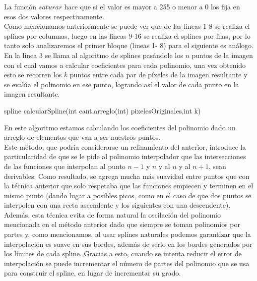 La función $saturar$ hace que si el valor es mayor a 255 o menor a 0 los fija en esos dos valores respectivamente.\\
Como mencionamos anteriormente se puede ver que de las lineas 1-8 se realiza el splines por columnas, luego en las lineas 9-16 se realiza el splines por filas, por lo tanto solo analizaremos el primer bloque (lineas 1- 8) para el siguiente es análogo.\\
En la linea 3 se llama al algoritmo de splines pasándole los $n$ puntos de la imagen con el cual vamos a calcular coeficientes para cada polinomio, una vez obtenido esto se recorren los $k$ puntos entre cada par de píxeles de la imagen resultante y se evalúa el polinomio en ese punto, logrando así el valor de cada punto en la imagen resultante. 
\begin{algorithm}[H]
\begin{algorithmic}[1]\parskip=1mm
\caption{spline calcularSpline(int cant,arreglo(int) pixelesOriginales,int k)}
  \STATE{\quad$ (cs_{i} + 1] - cs[i]) / (3 * k)$}
\end{algorithmic}
\end{algorithm}

En este algoritmo \cite{burden} estamos calculando los coeficientes del polinomio dado un arreglo de elementos que van a ser nuestros puntos.\\

Este método, que podría considerarse un refinamiento del anterior, introduce la particularidad de que se le pide al polinomio interpolador que las intersecciones de las funciones que interpolan al punto $n-1$ y $n$ y al $n$ y al $n+1$, sean derivables. Como resultado, se agrega mucha más suavidad entre puntos que con la técnica anterior que solo respetaba que las funciones empiecen y terminen en el mismo punto (dando lugar a posibles picos, como en el caso de que dos puntos se interpolen con una recta ascendente y los siguientes con una descendente). Además, esta técnica evita de forma natural la oscilación del polinomio mencionada en el método anterior dado que siempre se toman polinomios por partes y, como mencionamos, al usar splines naturales podemos garantizar que la interpolación es suave en sus bordes, además de serlo en los bordes generados por los límites de cada spline. Gracias a esto, cuando se intenta reducir el error de interpolación se puede incrementar el número de partes del polinomio que se usa para construir el spline, en lugar de incrementar su grado.

